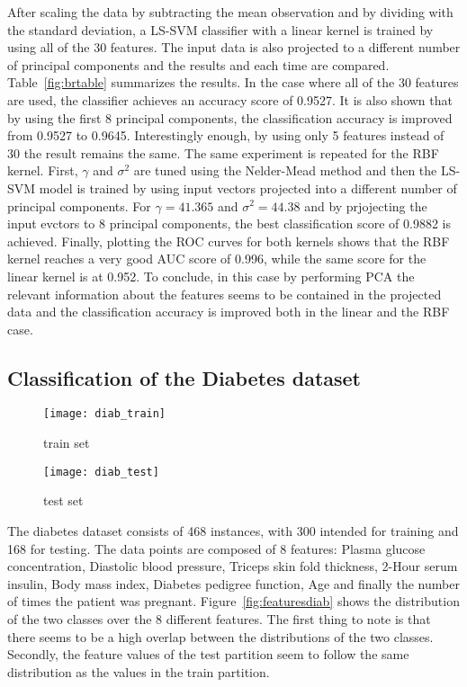 \documentclass[conference,compsoc]{IEEEtran}
\begin{document}
After scaling the data by subtracting the mean observation and by dividing with the standard deviation, a LS-SVM classifier with a linear kernel is trained by using all of the 30 features. The input data is also projected to a different number of principal components and the results and each time  are compared. Table~\ref{fig:brtable} summarizes the results. In the case where all of the 30 features are used, the classifier achieves an accuracy score of 0.9527. It is also shown that by using the first 8 principal components, the classification accuracy is improved from 0.9527 to 0.9645. Interestingly enough, by using only 5 features instead of 30 the result remains the same. The same experiment is repeated for the RBF kernel. First, $\gamma$ and $\sigma^2$ are tuned using the Nelder-Mead method and then the LS-SVM model is trained by using input vectors projected into a different number of principal components. For $\gamma=41.365$ and $\sigma^2=44.38$ and by prjojecting the input evctors to 8 principal components, the best classification score of 0.9882 is achieved. Finally, plotting the ROC curves for both kernels shows that the RBF kernel reaches a very good AUC score of 0.996, while the same score for the linear kernel is at 0.952. To conclude, in this case by performing PCA the relevant information about the features seems to be contained in the projected data and the classification accuracy is improved both in the linear and the RBF case.



\subsection{Classification of the Diabetes dataset}

\begin{figure*}[]
\centering
        \begin{subfigure}{1\linewidth}
            \texttt{[image: diab\_train]}
            \caption{train set}
        \end{subfigure}
        \begin{subfigure}{1\linewidth}
            \texttt{[image: diab\_test]}
            \caption{test set}
        \end{subfigure}
        \centering
\caption{Distribution of features for the diabetes dataset}                 
        \label{fig:featuresdiab}
    \end{figure*}

The diabetes dataset consists of 468 instances, with 300 intended for training and 168 for testing. The data points are composed of 8 features: Plasma glucose concentration, Diastolic blood pressure, Triceps skin fold thickness, 2-Hour serum insulin, Body mass index, Diabetes pedigree function, Age and finally the number of times the patient was pregnant. Figure~\ref{fig:featuresdiab} shows the distribution of the two classes over the 8 different features. The first thing to note is that there seems to be a high overlap between the distributions of the two classes. Secondly, the feature values of the test partition seem to follow the same distribution as the values in the train partition.
\end{document}
